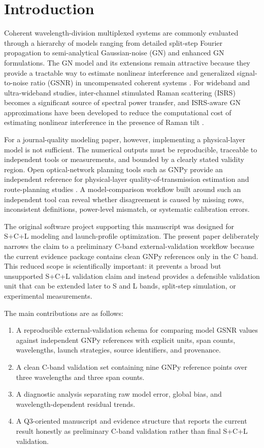 \documentclass[journal]{IEEEtran}
\begin{document}
\section{Introduction}
Coherent wavelength-division multiplexed systems are commonly evaluated through a hierarchy of models ranging from detailed split-step Fourier propagation to semi-analytical Gaussian-noise (GN) and enhanced GN formulations. The GN model and its extensions remain attractive because they provide a tractable way to estimate nonlinear interference and generalized signal-to-noise ratio (GSNR) in uncompensated coherent systems \cite{poggiolini2012gn,poggiolini2014applications,carena2014egn}. For wideband and ultra-wideband studies, inter-channel stimulated Raman scattering (ISRS) becomes a significant source of spectral power transfer, and ISRS-aware GN approximations have been developed to reduce the computational cost of estimating nonlinear interference in the presence of Raman tilt \cite{saavedra2018isrs,semrau2019isrsgn}.

For a journal-quality modeling paper, however, implementing a physical-layer model is not sufficient. The numerical outputs must be reproducible, traceable to independent tools or measurements, and bounded by a clearly stated validity region. Open optical-network planning tools such as GNPy provide an independent reference for physical-layer quality-of-transmission estimation and route-planning studies \cite{ferrari2020gnpy,gnpyDocs}. A model-comparison workflow built around such an independent tool can reveal whether disagreement is caused by missing rows, inconsistent definitions, power-level mismatch, or systematic calibration errors.

The original software project supporting this manuscript was designed for S+C+L modeling and launch-profile optimization. The present paper deliberately narrows the claim to a preliminary C-band external-validation workflow because the current evidence package contains clean GNPy references only in the C band. This reduced scope is scientifically important: it prevents a broad but unsupported S+C+L validation claim and instead provides a defensible validation unit that can be extended later to S and L bands, split-step simulation, or experimental measurements.

The main contributions are as follows:
\begin{enumerate}
    \item A reproducible external-validation schema for comparing model GSNR values against independent GNPy references with explicit units, span counts, wavelengths, launch strategies, source identifiers, and provenance.
    \item A clean C-band validation set containing nine GNPy reference points over three wavelengths and three span counts.
    \item A diagnostic analysis separating raw model error, global bias, and wavelength-dependent residual trends.
    \item A Q3-oriented manuscript and evidence structure that reports the current result honestly as preliminary C-band validation rather than final S+C+L validation.
\end{enumerate}
\end{document}
